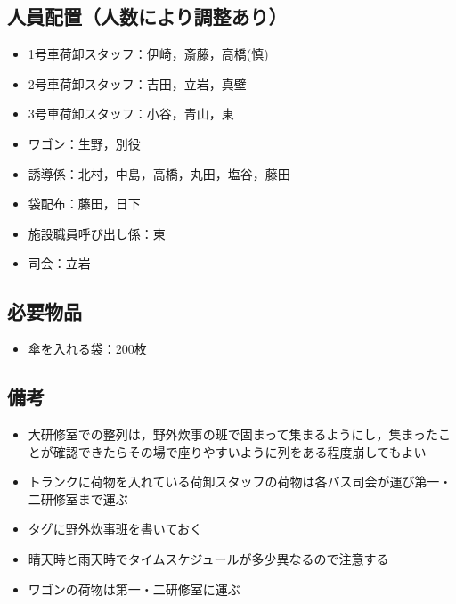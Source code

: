 \subsection{人員配置（人数により調整あり）}
\begin{itemize}

\item 1号車荷卸スタッフ：伊崎，斎藤，高橋(慎)
\item 2号車荷卸スタッフ：吉田，立岩，真壁

\item 3号車荷卸スタッフ：小谷，青山，東
\item ワゴン：生野，別役

\item 誘導係：北村，中島，高橋，丸田，塩谷，藤田
\item 袋配布：藤田，日下

\item 施設職員呼び出し係：東
\item 司会：立岩
\end{itemize}


\subsection{必要物品}
\begin{itemize}
\item 傘を入れる袋：200枚
\end{itemize}


\subsection{備考}
\begin{itemize}
\item 大研修室での整列は，野外炊事の班で固まって集まるようにし，集まったことが確認できたらその場で座りやすいように列をある程度崩してもよい
\item トランクに荷物を入れている荷卸スタッフの荷物は各バス司会が運び第一・二研修室まで運ぶ
\item タグに野外炊事班を書いておく
\item 晴天時と雨天時でタイムスケジュールが多少異なるので注意する
\item ワゴンの荷物は第一・二研修室に運ぶ
\end{itemize}


%

